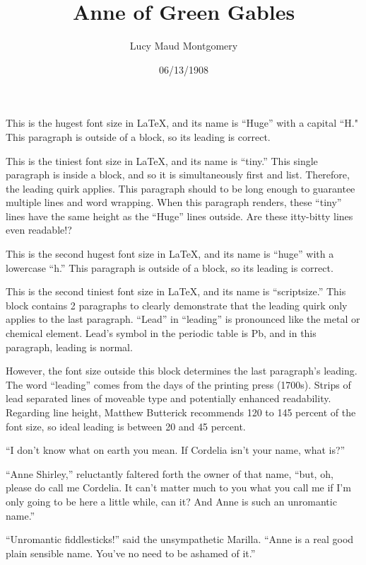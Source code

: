 \documentclass[a4paper]{article}
\title{Anne of Green Gables}
\author{Lucy Maud Montgomery}
\date{06/13/1908}
\begin{document}
\maketitle

\Huge This is the hugest font size in \LaTeX, and its name is ``Huge'' with a capital ``H." This paragraph is outside of a block, so its leading is correct.

{\tiny This is the tiniest font size in \LaTeX, and its name is ``tiny.'' This single paragraph is inside a block, and so it is simultaneously first and list. Therefore, the leading quirk applies. This paragraph should to be long enough to guarantee multiple lines and word wrapping. When this paragraph renders, these ``tiny'' lines have the same height as the ``Huge'' lines outside. Are these itty-bitty lines even readable!?}

\huge This is the second hugest font size in \LaTeX, and its name is ``huge'' with a lowercase ``h.'' This paragraph is outside of a block, so its leading is correct.

{\scriptsize This is the second tiniest font size in \LaTeX, and its name is ``scriptsize.'' This block contains 2 paragraphs to clearly demonstrate that the leading quirk only applies to the last paragraph. ``Lead'' in ``leading'' is pronounced like the metal or chemical element. Lead's symbol in the periodic table is Pb, and in this paragraph, leading is normal.

However, the font size outside this block determines the last paragraph's leading. The word ``leading'' comes from the days of the printing press (1700s). Strips of lead separated lines of moveable type and potentially enhanced readability. Regarding line height, Matthew Butterick recommends 120 to 145 percent of the font size, so ideal leading is between 20 and 45 percent.}

\Huge``I don't know what on earth you mean. If Cordelia isn't your name, what is?''

{\tiny``Anne Shirley,'' reluctantly faltered forth the owner of that name, ``but, oh, please do call me Cordelia. It can't matter much to you what you call me if I'm only going to be here a little while, can it? And Anne is such an unromantic name.''}

\huge``Unromantic fiddlesticks!'' said the unsympathetic Marilla. ``Anne is a real good plain sensible name. You've no need to be ashamed of it.''
\end{document}

